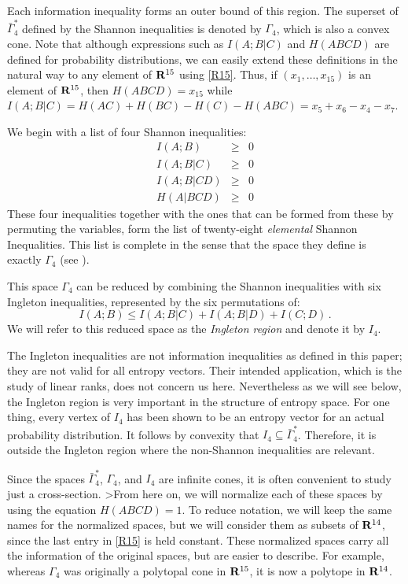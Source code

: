 \documentclass[10pt,journal]{IEEEtran}
\begin{document}
Each information inequality forms an outer bound of this region.  The superset of $\bar\Gamma^*_4$
defined by the Shannon inequalities is denoted by $\Gamma_4$, which is also a convex cone.
Note that although expressions such as $I(A;B|C)$ and $H(ABCD)$ are defined for probability distributions,
we can easily extend these definitions in the natural way to any element of $\mathbf{R}^{15}$ using \eqref{R15}.  Thus, if
$(x_1, \ldots, x_{15})$ is an element of $\mathbf{R}^{15}$, then  $H(ABCD)= x_{15}$
while $I(A;B|C) = H(AC)+H(BC)-H(C)-H(ABC)=x_{5}+x_{6}-x_{4}-x_{7}$.

We begin with a list of four Shannon inequalities:
\begin{eqnarray*}
I(A;B) &\geq& 0 \\
I(A;B|C) &\geq& 0 \\
I(A;B|CD) &\geq& 0 \\
H(A|BCD) &\geq& 0
\end{eqnarray*}
These four inequalities together with the ones that can be formed from these by permuting the variables, form
the list of twenty-eight {\em elemental} Shannon Inequalities. This list is complete in the sense that
the space they define is exactly $\Gamma_4$ (see \cite{Yeung-book}).

This space $\Gamma_4$ can be reduced by combining the Shannon inequalities with six Ingleton inequalities, represented by the six permutations of:
\begin{equation}\label{ingleton}
I(A;B) \leq I(A;B|C)+I(A;B|D)+I(C;D) \, .
\end{equation}
We will refer to this reduced space as the {\em Ingleton region} and denote it by $I_4$.

The Ingleton inequalities are not information inequalities as defined in this paper; they are not valid for all entropy vectors.
Their intended application, which is the study of linear ranks, does not concern us here.
Nevertheless as we will see below, the Ingleton region is very important in the structure of entropy space.
For one thing, every vertex of $I_4$ has been shown to be
an entropy vector for an actual probability distribution.  It follows by convexity that
$I_4 \subseteq \bar\Gamma^*_4$.  Therefore, it is outside the Ingleton region where
the non-Shannon inequalities are relevant.

Since the spaces $\bar\Gamma^*_4$, $\Gamma_4$, and $I_4$ are infinite cones, it is often convenient to study just a cross-section.
>From here on, we will normalize each of these spaces by using the equation $H(ABCD)=1$.  To reduce notation, we will keep the same
names for the normalized spaces, but we will consider them as subsets of $\mathbf{R}^{14}$, since the last entry
in \eqref{R15} is held constant.  These normalized spaces carry all the information of the original spaces, but are
easier to describe.
For example, whereas $\Gamma_4$ was originally a polytopal cone in $\mathbf{R}^{15}$, it is now a polytope in $\mathbf{R}^{14}$.
\end{document}
